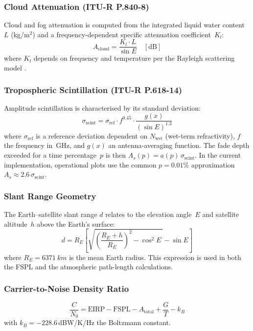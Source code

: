 \documentclass[conference]{IEEEtran}
\begin{document}
\subsubsection{Cloud Attenuation (ITU-R P.840-8)}
Cloud and fog attenuation is computed from the integrated liquid water
content~$L$ (kg/m$^2$) and a frequency-dependent specific attenuation
coefficient~$K_l$:
\begin{equation}
  A_{\text{cloud}} = \frac{K_l \cdot L}{\sin E}
  \quad [\text{dB}]
  \label{eq:cloud}
\end{equation}
where $K_l$ depends on frequency and temperature per the Rayleigh
scattering model \cite{itu_p840}.

\subsubsection{Tropospheric Scintillation (ITU-R P.618-14)}
Amplitude scintillation is characterised by its standard deviation:
\begin{equation}
  \sigma_{\text{scint}} = \sigma_{\text{ref}} \cdot f^{0.45}
    \cdot \frac{g(x)}{(\sin E)^{1.3}}
  \label{eq:scint}
\end{equation}
where $\sigma_{\text{ref}}$ is a reference deviation dependent on
$N_{\text{wet}}$ (wet-term refractivity), $f$ the frequency in~GHz,
and $g(x)$ an antenna-averaging function.  The fade depth exceeded for
a time percentage~$p$ is then $A_s(p) = a(p)\,\sigma_{\text{scint}}$.
In the current implementation, operational plots use the common
$p=0.01\%$ approximation $A_s \approx 2.6\,\sigma_{\text{scint}}$.

\subsubsection{Slant Range Geometry}
The Earth--satellite slant range $d$ relates to the elevation angle~$E$
and satellite altitude~$h$ above the Earth's surface:
\begin{equation}
  d = R_E\!\left[\sqrt{\left(\frac{R_E + h}{R_E}\right)^{\!2}
      - \cos^2\!E\,} - \sin E\right]
  \label{eq:slant}
\end{equation}
where $R_E = \SI{6371}{km}$ is the mean Earth radius.  This expression
is used in both the FSPL and the atmospheric path-length calculations.

\subsubsection{Carrier-to-Noise Density Ratio}
\begin{equation}
  \frac{C}{N_0} = \text{EIRP} - \text{FSPL} - A_{\text{total}}
                  + \frac{G}{T} - k_B
  \label{eq:cn0}
\end{equation}
with $k_B = -228.6$\,dBW/K/Hz the Boltzmann constant.
\end{document}
